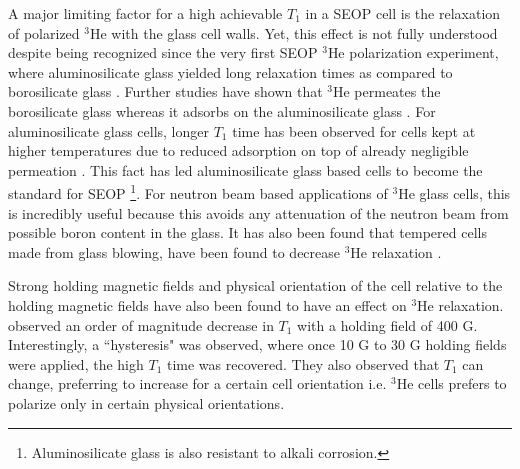 A major limiting factor for a high achievable $T_1$ in a SEOP cell is the relaxation of polarized $^3$He with the glass cell walls. Yet, this effect is not fully understood despite being recognized since the very first SEOP $^3$He polarization experiment, where aluminosilicate glass yielded long relaxation times as compared to borosilicate glass \cite{Fitzsimmons1969}. Further studies have shown that $^3$He permeates the borosilicate glass whereas it adsorbs on the aluminosilicate glass \cite{Jacob2003, Gentile2017}. For aluminosilicate glass cells, longer $T_1$ time has been observed for cells kept at higher temperatures due to reduced adsorption on top of already negligible permeation \cite{Jacob2003}. This fact has led aluminosilicate glass based cells to become the standard for SEOP \footnote{Aluminosilicate glass is also resistant to alkali corrosion.}. For neutron beam based applications of $^3$He glass cells, this is incredibly useful because this avoids any attenuation of the neutron beam from possible boron content in the glass. It has also been found that tempered cells made from glass blowing, have been found to decrease $^3$He relaxation \cite{Rich2002, Parnell2009, Chen2011}.

Strong holding magnetic fields and physical orientation of the cell relative to the holding magnetic fields have also been found to have an effect on $^3$He relaxation. \cite{Chen2011} observed an order of magnitude decrease in $T_1$ with a holding field of 400 G. Interestingly, a ``hysteresis" was observed, where once 10 G to 30 G holding fields were applied, the high $T_1$ time was recovered. They also observed that $T_1$ can change, preferring to increase for a certain cell orientation i.e. $^3$He cells prefers to polarize only in certain physical orientations. 

